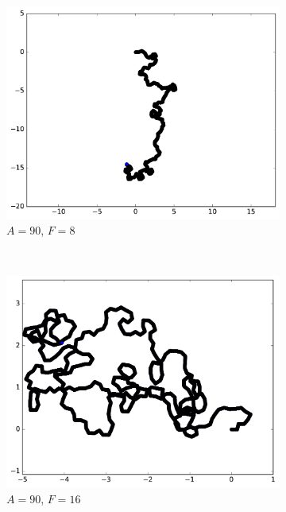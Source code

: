 \begin{figure}[htb]
\begin{subfigure}[t]{\subImgWmo}
			\includegraphics[width=\textwidth]{figures/ch3/synTraj_219_90_8}
			\caption[$A = 90$, $F=8$]{$A = 90$, $F=8$}
			\label{fig:synTraj_219_90_8}
		\end{subfigure}
		~
		\begin{subfigure}[t]{\subImgWmo}
			\centering
			\includegraphics[width=\textwidth]{figures/ch3/synTraj_219_90_16}
			\caption[$A = 90$, $F=16$]{$A = 90$, $F=16$}
			\label{fig:synTraj_219_90_16}
		\end{subfigure}
		~
		\begin{subfigure}[t]{\subImgWmo}
			\centering

\end{subfigure}
\end{figure}

